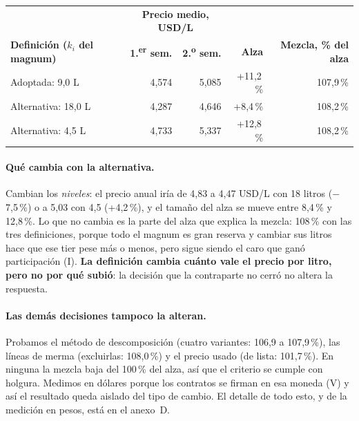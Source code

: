 \begin{center}
\small
\begin{tabular}{l r r r r}
\hline
& \multicolumn{2}{c}{\textbf{Precio medio, USD/L}} & & \\
\textbf{Definición ($k_i$ del magnum)} & \textbf{1.\textsuperscript{er} sem.} & \textbf{2.\textsuperscript{o} sem.} & \textbf{Alza} & \textbf{Mezcla, \% del alza} \\
\hline
Adoptada: 9,0 L & 4,574 & 5,085 & +11,2\,\% & 107,9\,\% \\
Alternativa: 18,0 L & 4,287 & 4,646 & +8,4\,\% & 108,2\,\% \\
Alternativa: 4,5 L & 4,733 & 5,337 & +12,8\,\% & 108,2\,\% \\
\hline
\end{tabular}
\end{center}

\paragraph{Qué cambia con la alternativa.} Cambian los \emph{niveles}: el precio anual iría de 4,83 a 4,47 USD/L con 18 litros ($-$7,5\,\%) o a 5,03 con 4,5 (+4,2\,\%), y el tamaño del alza se mueve entre 8,4\,\% y 12,8\,\%. Lo que no cambia es la parte del alza que explica la mezcla: 108\,\% con las tres definiciones, porque todo el magnum es gran reserva y cambiar sus litros hace que ese tier pese más o menos, pero sigue siendo el caro que ganó participación (I). \textbf{La definición cambia cuánto vale el precio por litro, pero no por qué subió}: la decisión que la contraparte no cerró no altera la respuesta.

\paragraph{Las demás decisiones tampoco la alteran.} Probamos el método de descomposición (cuatro variantes: 106,9 a 107,9\,\%), las líneas de merma (excluirlas: 108,0\,\%) y el precio usado (de lista: 101,7\,\%). En ninguna la mezcla baja del 100\,\% del alza, así que el criterio se cumple con holgura. Medimos en dólares porque los contratos se firman en esa moneda (V) y así el resultado queda aislado del tipo de cambio. El detalle de todo esto, y de la medición en pesos, está en el anexo~D.
